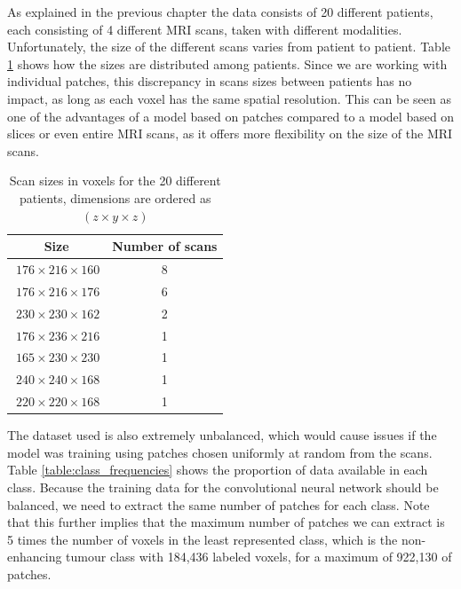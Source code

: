 \documentclass[12pt,a4paper,twoside,openright]{report}
\begin{document}
 
As explained in the previous chapter the data consists of 20 different patients, each consisting of 4 different MRI scans, taken with different modalities. Unfortunately, the size of the different scans varies from patient to patient. Table \ref{table:scan_sizes} shows how the sizes are distributed among patients. Since we are working with individual patches, this discrepancy in scans sizes between patients has no impact, as long as each voxel has the same spatial resolution. This can be seen as one of the advantages of a model based on patches compared to a model based on slices or even entire MRI scans, as it offers more flexibility on the size of the MRI scans.

\begin{table}[h]
\centering	
\label{table:scan_sizes}
\begin{tabular}{ c c } 
\textbf{Size} & \textbf{Number of scans}\\
 \hline
 $\ 176 \times 216 \times 160$ & 8 \\ 
 $\ 176 \times 216 \times 176$ & 6 \\ 
 $\ 230 \times 230 \times 162$ & 2 \\ 
 $\ 176 \times 236 \times 216$ & 1 \\ 
 $\ 165 \times 230 \times 230$ & 1 \\ 
 $\ 240 \times 240 \times 168$ & 1 \\ 
 $\ 220 \times 220 \times 168$ & 1 \\ 

\end{tabular}
\caption{Scan sizes in voxels for the 20 different patients, dimensions are ordered as $(z \times y \times z)$}
\end{table}

The dataset used is also extremely unbalanced, which would cause issues if the model was training using patches chosen uniformly at random from the scans. Table \ref{table:class_frequencies} shows the proportion of data available in each class. Because the training data for the convolutional neural network should be balanced, we need to extract the same number of patches for each class. Note that this further implies that the maximum number of patches we can extract is 5 times the number of voxels in the least represented class, which is the non-enhancing tumour class with 184,436 labeled voxels, for a maximum of 922,130 of patches.
\end{document}
